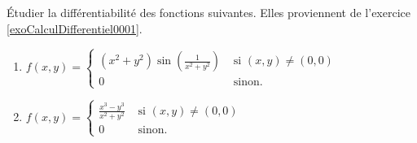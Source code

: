 \begin{exercice}\label{exoCalculDifferentiel0021}

	Étudier la différentiabilité des fonctions suivantes. Elles proviennent de l'exercice \ref{exoCalculDifferentiel0001}.
	\begin{enumerate}
		\item
			$f(x,y) = \left\{
			\begin{array}{cc}
				(x^2 + y^2)\sin\displaystyle\left ( \frac{1}{x^2+y^2} \right )& \mbox{ si }(x,y) \neq (0,0) \\
				0 & \mbox{ sinon. }
			\end{array}
				\right .$
		 \item
			$f(x,y) = \left\{
			\begin{array}{cc}
				\displaystyle\frac{x^3 - y^3}{x^2+y^2}& \mbox{ si }(x,y) \neq (0,0) \\
				0 & \mbox{ sinon. }
			\end{array}
				\right . $
	\end{enumerate}

\end{exercice}
